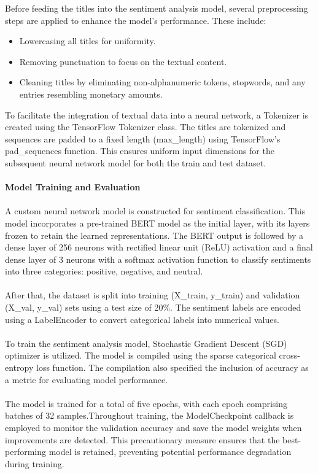\documentclass[12pt]{article}
\begin{document}
{{Before feeding the titles into the sentiment analysis model, several preprocessing steps are applied to enhance the model's performance. These include:}
\begin{itemize}
\item Lowercasing all titles for uniformity.
\item Removing punctuation to focus on the textual content.
\item Cleaning titles by eliminating non-alphanumeric tokens, stopwords, and any entries resembling monetary amounts.
\end{itemize}
{To facilitate the integration of textual data into a neural network, a Tokenizer is created using the TensorFlow Tokenizer class. The titles are tokenized and sequences are padded to a fixed length (max\_length) using TensorFlow's pad\_sequences function. This ensures uniform input dimensions for the subsequent neural network model for both the train and test dataset.}\\ \\
{\bf  Model Training and Evaluation}\\ \\
{A custom neural network model is constructed for sentiment classification. This model incorporates a pre-trained BERT model as the initial layer, with its layers frozen to retain the learned representations. The BERT output is followed by a dense layer of 256 neurons with rectified linear unit (ReLU) activation and a final dense layer of 3 neurons with a softmax activation function to classify sentiments into three categories: positive, negative, and neutral.}\\ \\
{After that, the dataset is split into training (X\_train, y\_train) and validation (X\_val, y\_val) sets using a test size of 20\%. The sentiment labels are encoded using a LabelEncoder to convert categorical labels into numerical values.}\\ \\
{To train the sentiment analysis model, Stochastic Gradient Descent (SGD) optimizer is utilized. The model is compiled using the sparse categorical cross-entropy loss function. The compilation also specified the inclusion of accuracy as a metric for evaluating model performance.}\\ \\
{The model is trained for a total of five epochs, with each epoch comprising batches of 32 samples.Throughout training, the ModelCheckpoint callback is employed to monitor the validation accuracy and save the model weights when improvements are detected. This precautionary measure ensures that the best-performing model is retained, preventing potential performance degradation during training.}\\ \\
}
\end{document}
